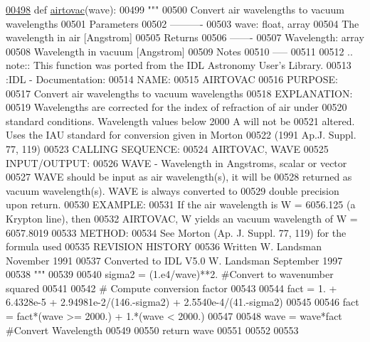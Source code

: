 \begin{DoxyCode}
\hypertarget{namespacepyneb_1_1utils_1_1physics_l00498}{}\hyperlink{namespacepyneb_1_1utils_1_1physics_a75304d89e533b2199decec697f90c9a4}{00498} \textcolor{keyword}{def }\hyperlink{namespacepyneb_1_1utils_1_1physics_a75304d89e533b2199decec697f90c9a4}{airtovac}(wave):
00499     \textcolor{stringliteral}{"""}
00500 \textcolor{stringliteral}{Convert air wavelengths to vacuum wavelengths}
00501 \textcolor{stringliteral}{Parameters}
00502 \textcolor{stringliteral}{----------}
00503 \textcolor{stringliteral}{wave: float, array}
00504 \textcolor{stringliteral}{The wavelength in air [Angstrom]}
00505 \textcolor{stringliteral}{Returns}
00506 \textcolor{stringliteral}{-------}
00507 \textcolor{stringliteral}{Wavelength: array}
00508 \textcolor{stringliteral}{Wavelength in vacuum [Angstrom]}
00509 \textcolor{stringliteral}{Notes}
00510 \textcolor{stringliteral}{-----}
00511 \textcolor{stringliteral}{}
00512 \textcolor{stringliteral}{.. note:: This function was ported from the IDL Astronomy User's Library.}
00513 \textcolor{stringliteral}{:IDL - Documentation:}
00514 \textcolor{stringliteral}{NAME:}
00515 \textcolor{stringliteral}{AIRTOVAC}
00516 \textcolor{stringliteral}{PURPOSE:}
00517 \textcolor{stringliteral}{Convert air wavelengths to vacuum wavelengths}
00518 \textcolor{stringliteral}{EXPLANATION:}
00519 \textcolor{stringliteral}{Wavelengths are corrected for the index of refraction of air under}
00520 \textcolor{stringliteral}{standard conditions. Wavelength values below 2000 A will not be}
00521 \textcolor{stringliteral}{altered. Uses the IAU standard for conversion given in Morton}
00522 \textcolor{stringliteral}{(1991 Ap.J. Suppl. 77, 119)}
00523 \textcolor{stringliteral}{CALLING SEQUENCE:}
00524 \textcolor{stringliteral}{AIRTOVAC, WAVE}
00525 \textcolor{stringliteral}{INPUT/OUTPUT:}
00526 \textcolor{stringliteral}{WAVE - Wavelength in Angstroms, scalar or vector}
00527 \textcolor{stringliteral}{WAVE should be input as air wavelength(s), it will be}
00528 \textcolor{stringliteral}{returned as vacuum wavelength(s). WAVE is always converted to}
00529 \textcolor{stringliteral}{double precision upon return.}
00530 \textcolor{stringliteral}{EXAMPLE:}
00531 \textcolor{stringliteral}{If the air wavelength is W = 6056.125 (a Krypton line), then}
00532 \textcolor{stringliteral}{AIRTOVAC, W yields an vacuum wavelength of W = 6057.8019}
00533 \textcolor{stringliteral}{METHOD:}
00534 \textcolor{stringliteral}{See Morton (Ap. J. Suppl. 77, 119) for the formula used}
00535 \textcolor{stringliteral}{REVISION HISTORY}
00536 \textcolor{stringliteral}{Written W. Landsman November 1991}
00537 \textcolor{stringliteral}{Converted to IDL V5.0 W. Landsman September 1997}
00538 \textcolor{stringliteral}{    """}
00539     
00540     sigma2 = (1.e4/wave)**2. \textcolor{comment}{#Convert to wavenumber squared}
00541     
00542     \textcolor{comment}{# Compute conversion factor}
00543     
00544     fact = 1. + 6.4328e-5 + 2.94981e-2/(146.-sigma2) + 2.5540e-4/(41.-sigma2)
00545     
00546     fact = fact*(wave >= 2000.) + 1.*(wave < 2000.)
00547     
00548     wave = wave*fact \textcolor{comment}{#Convert Wavelength}
00549     
00550     \textcolor{keywordflow}{return} wave
00551 
00552 
00553 
\end{DoxyCode}
